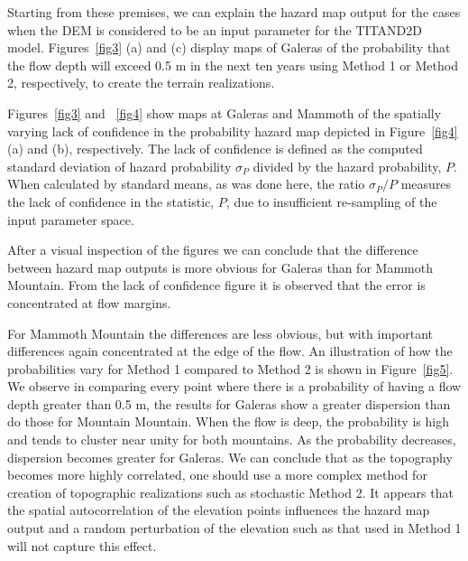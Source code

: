 \documentclass[12pt]{article}
\begin{document}
Starting from these premises, we can explain the hazard map output for
the cases when the DEM is considered to be an input parameter for the
TITAND2D model.  Figures~\ref{fig3} (a) and (c) display maps of
Galeras of the probability that the flow depth will exceed 0.5 m in
the next ten years using Method 1 or Method 2, respectively, to create
the terrain realizations.
 
Figures~\ref{fig3} and ~\ref{fig4} show maps at Galeras and Mammoth of
the spatially varying lack of confidence in the probability hazard map
depicted in Figure~\ref{fig4} (a) and (b), respectively. The lack of
confidence is defined as the computed standard deviation of hazard
probability $\sigma_P$ divided by the hazard probability, $P$.  When
calculated by standard means, as was done here, the ratio $\sigma_P/P$
measures the lack of confidence in the statistic, $P$, due to
insufficient re-sampling of the input parameter space.

After a visual inspection of the figures we can conclude that the
difference between hazard map outputs is more obvious for Galeras than
for Mammoth Mountain.  From the lack of confidence figure it is observed
that the error is concentrated at flow margins.

For Mammoth Mountain the differences are less obvious, but with
important differences again concentrated at the edge of the flow.  An
illustration of how the probabilities vary for Method 1 compared to
Method 2 is shown in Figure~\ref{fig5}. We observe in comparing every
point where there is a probability of having a flow depth greater than
0.5 m, the results for Galeras show a greater dispersion than do those
for Mountain Mountain.  When the flow is deep, the probability is high
and tends to cluster near unity for both mountains.  As the
probability decreases, dispersion becomes greater for Galeras.  We can
conclude that as the topography becomes more highly correlated, one
should use a more complex method for creation of topographic
realizations such as stochastic Method 2. It appears that the spatial
autocorrelation of the elevation points influences the hazard map
output and a random perturbation of the elevation such as that used in
Method 1 will not capture this effect.
\end{document}
